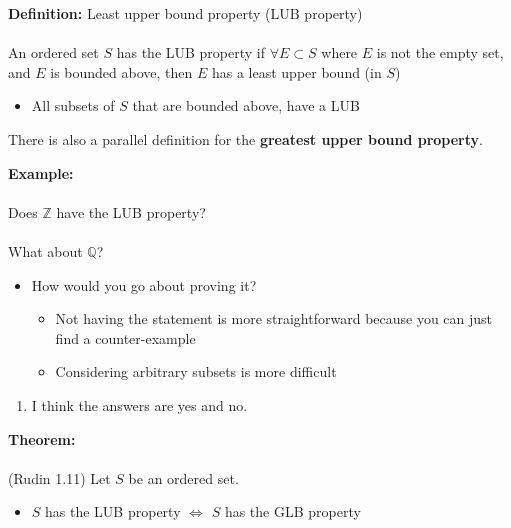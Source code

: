 \documentclass{article}
\newcommand{\Z}{\mathbb{Z}}
\newcommand{\Q}{\mathbb{Q}}
\begin{document}
\begin{definition} 
	\textbf{Definition:} Least upper bound property (LUB property) \\
~\\
An ordered set $S$ has the LUB property if $\forall E\subset S$ where $E$ is not the empty set, and $E$ is bounded above, then $E$ has a least upper bound (in $S$)
\begin{itemize}
	\item All subsets of $S$ that are bounded above, have a LUB
\end{itemize}
There is also a parallel definition for the {\color{blue} \textbf{greatest upper bound property}}.
\end{definition}
\begin{example} 
\textbf{Example:}  \\
~\\
Does $\Z$ have the LUB property? \\
~\\
What about $\Q$? \\
\begin{itemize}
	\item How would you go about proving it?
	\begin{itemize}
		\item Not having the statement is more straightforward because you can just find a counter-example
		\item Considering arbitrary subsets is more difficult
	\end{itemize}
\end{itemize}
\begin{enumerate}
	\item I think the answers are yes and no.
\end{enumerate}
\end{example}
\begin{theorem} 
\textbf{Theorem:} {\color{blue} } \\
~\\
(Rudin 1.11) Let $S$ be an ordered set.
\begin{itemize}
	\item $S$ has the LUB property $\iff$ $S$ has the GLB property
\end{itemize}
\end{theorem}
\end{document}
